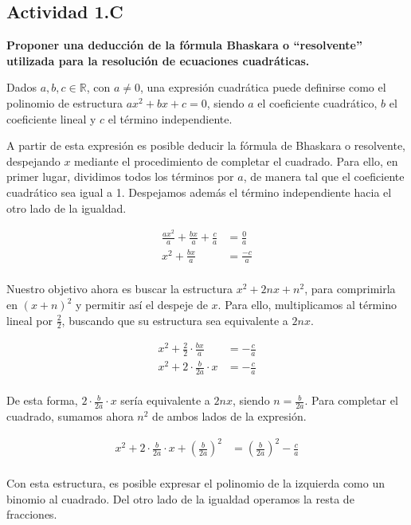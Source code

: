 \subsection*{Actividad 1.C}
\textbf{Proponer una deducción de la fórmula Bhaskara o “resolvente”
utilizada para la resolución de ecuaciones cuadráticas.}

Dados $a, b, c \in \mathbb{R}$, con $a \neq 0$, una expresión cuadrática puede definirse como el polinomio de estructura $ax^2 + bx + c = 0$, siendo $a$ el coeficiente cuadrático, $b$ el coeficiente lineal y $c$ el término independiente.

A partir de esta expresión es posible deducir la fórmula de Bhaskara o resolvente, despejando $x$ mediante el procedimiento de completar el cuadrado. Para ello, en primer lugar, dividimos todos los términos por $a$, de manera tal que el coeficiente cuadrático sea igual a 1. Despejamos además el término independiente hacia el otro lado de la igualdad.

\begin{align*}
	\frac{ax^2}{a} + \frac{bx}{a} + \frac{c}{a} &= \frac{0}{a}\\
	x^2 + \frac{bx}{a} &= \frac{-c}{a}\\
\end{align*}

Nuestro objetivo ahora es buscar la estructura $x^2 + 2nx + n^2$, para comprimirla en $(x+n)^2$ y permitir así el despeje de $x$. Para ello, multiplicamos al término lineal por $\frac{2}{2}$, buscando que su estructura sea equivalente a $2nx$.

\begin{align*}
	x^2 + \frac{2}{2} \cdot \frac{bx}{a} &= - \frac{c}{a}\\
	x^2 + 2 \cdot \frac{b}{2a} \cdot x &= - \frac{c}{a}\\
\end{align*}

De esta forma, $2 \cdot \frac{b}{2a} \cdot x$ sería equivalente a $2nx$, siendo $n = \frac{b}{2a}$. Para completar el cuadrado, sumamos ahora $n^2$ de ambos lados de la expresión.

\begin{align*}
	x^2 + 2 \cdot \frac{b}{2a} \cdot x + \left(\frac{b}{2a}\right)^2 &= \left(\frac{b}{2a}\right)^2 - \frac{c}{a}\\
\end{align*}

Con esta estructura, es posible expresar el polinomio de la izquierda como un binomio al cuadrado. Del otro lado de la igualdad operamos la resta de fracciones.

